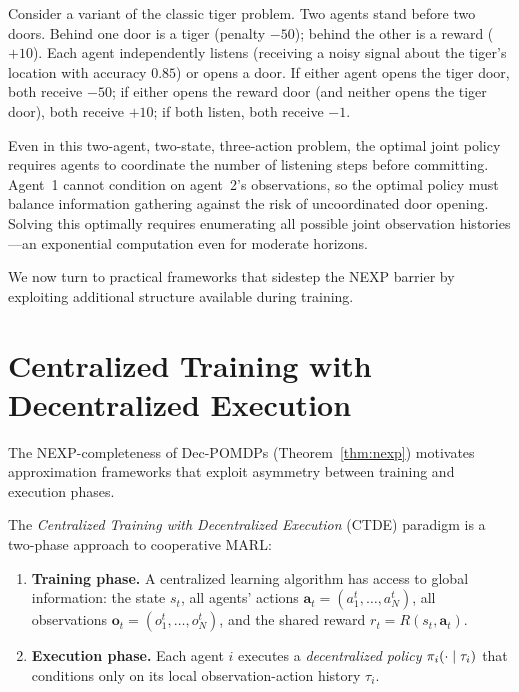 \documentclass[11pt,a4paper]{article}
\begin{document}
\begin{example}
\label{ex:tiger}
Consider a variant of the classic tiger problem.  Two agents stand
before two doors.  Behind one door is a tiger (penalty $-50$); behind
the other is a reward ($+10$).  Each agent independently listens
(receiving a noisy signal about the tiger's location with accuracy
$0.85$) or opens a door.  If either agent opens the tiger door,
both receive $-50$; if either opens the reward door (and neither
opens the tiger door), both receive $+10$; if both listen, both
receive $-1$.

Even in this two-agent, two-state, three-action problem, the
optimal joint policy requires agents to coordinate the number of
listening steps before committing.  Agent~1 cannot condition on
agent~2's observations, so the optimal policy must balance
information gathering against the risk of uncoordinated door
opening.  Solving this optimally requires enumerating all possible
joint observation histories---an exponential computation even for
moderate horizons.
\end{example}

We now turn to practical frameworks that sidestep the NEXP barrier
by exploiting additional structure available during training.

\section{Centralized Training with Decentralized Execution}
\label{sec:ctde}

The NEXP-completeness of Dec-POMDPs (Theorem~\ref{thm:nexp})
motivates approximation frameworks that exploit asymmetry between
training and execution phases.

\begin{definition}
\label{def:ctde}
The \emph{Centralized Training with Decentralized Execution}
(CTDE) paradigm is a two-phase approach to cooperative MARL:
\begin{enumerate}[nosep]
  \item \textbf{Training phase.}  A centralized learning algorithm
    has access to global information: the state $s_t$, all agents'
    actions $\mathbf{a}_t = (a_1^t, \ldots, a_N^t)$, all observations
    $\mathbf{o}_t = (o_1^t, \ldots, o_N^t)$, and the shared reward
    $r_t = R(s_t, \mathbf{a}_t)$.
  \item \textbf{Execution phase.}  Each agent $i$ executes a
    \emph{decentralized policy} $\pi_i(\cdot \mid \tau_i)$ that
    conditions only on its local observation-action history $\tau_i$.
\end{enumerate}
\end{definition}
\end{document}
